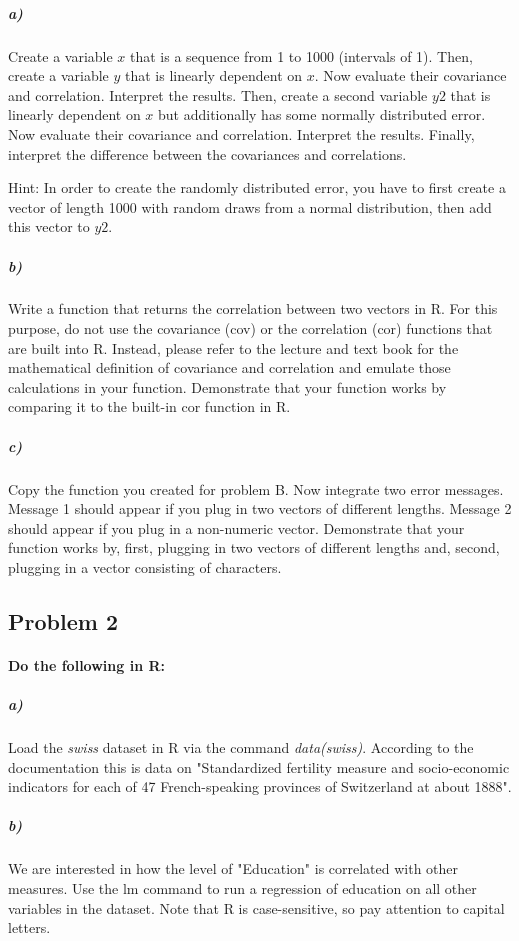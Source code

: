 \documentclass[12pt,letter]{article}
\begin{document}
\subparagraph{a)} Create a variable $x$ that is a sequence from 1 to 1000 (intervals of 1). Then, create a variable $y$ that is linearly dependent on $x$. Now evaluate their covariance and correlation. Interpret the results. Then, create a second variable $y2$ that is linearly dependent on $x$ but additionally has some normally distributed error. Now evaluate their covariance and correlation. Interpret the results. Finally, interpret the difference between the covariances and correlations.

Hint: In order to create the randomly distributed error, you have to first create a vector of length 1000 with random draws from a normal distribution, then add this vector to $y2$.

\subparagraph{b)} Write a function that returns the correlation between two vectors in R. For this purpose, do not use the covariance (cov) or the correlation (cor) functions that are built into R. Instead, please refer to the lecture and text book for the mathematical definition of covariance and correlation and emulate those calculations in your function. Demonstrate that your function works by comparing it to the built-in cor function in R.

\subparagraph{c)} Copy the function you created for problem B. Now integrate two error messages. Message 1 should appear if you plug in two vectors of different lengths. Message 2 should appear if you plug in a non-numeric vector. Demonstrate that your function works by, first, plugging in two vectors of different lengths and, second, plugging in a vector consisting of characters.



\subsection*{Problem 2}

\paragraph{Do the following in R:}

\subparagraph{a)} Load the \textit{swiss} dataset in R via the command  \textit{data(swiss)}. According to the documentation this is data on "Standardized fertility measure and socio-economic indicators for each of 47 French-speaking provinces of Switzerland at about 1888".

\subparagraph{b)} We are interested in how the level of "Education" is correlated with other measures. Use the lm command to run a regression of education on all other variables in the dataset. Note that R is case-sensitive, so pay attention to capital letters.
\end{document}
